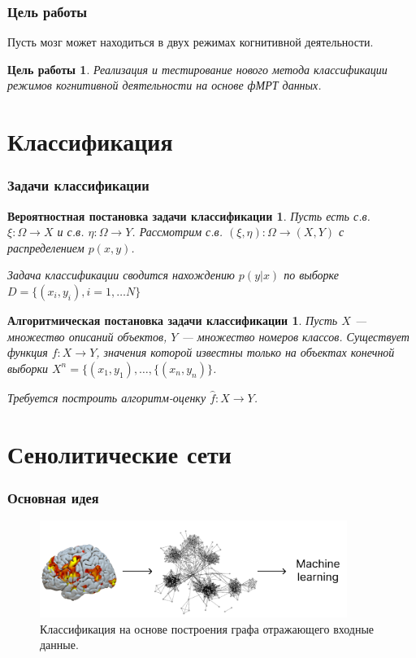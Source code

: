 \documentclass{beamer}
\newtheorem{target_}{Цель работы}
\newtheorem{prob_}{Вероятностная постановка задачи классификации}
\newtheorem{algo_}{Алгоритмическая постановка задачи классификации}
\begin{document}
	\begin{frame} 
		\frametitle{Цель работы}
		Пусть мозг может находиться в двух режимах когнитивной деятельности. 
		
		\begin{target_}
			Реализация и тестирование нового метода классификации режимов когнитивной деятельности на основе фМРТ данных.
		\end{target_}			
	\end{frame}

	\section{Классификация}
	\begin{frame} 
		\frametitle{Задачи классификации}
		\begin{prob_}
			Пусть есть с.в. $\xi: \Omega \rightarrow X$ и с.в. $\eta: \Omega \rightarrow Y$. Рассмотрим с.в. $(\xi, \eta): \Omega \rightarrow (X, Y)$ с распределением $p(x, y)$.
			\vspace{0.5cm}
			
			Задача классификации сводится нахождению $p(y|x)$ по выборке $D = \{(x_{i}, y_{i}), i = 1, \dots N\}$
		\end{prob_}
	
		\begin{algo_}
			Пусть $X$ --- множество описаний объектов, $Y$ --- множество номеров классов. Существует функция $f: X \rightarrow Y$, значения которой известны только на объектах конечной выборки $X^{n} = \{(x_{1}, y_{1}), \dots, \{(x_{n}, y_{n})\}$. 
			\vspace{0.5cm}
			
			Требуется построить алгоритм-оценку $\widehat{f}: X \rightarrow Y$.
		\end{algo_}
	\end{frame}
	
	\section{Сенолитические сети}
	\begin{frame} 
		\frametitle{Основная идея}
		\begin{figure}
			\includegraphics[width=10cm]{../images/fmri_graph_ml_1.pdf}
			\caption{Классификация на основе построения графа отражающего входные данные.} 
			\label{fg:3}
		\end{figure}
	\end{frame}
		
		
\end{document}
